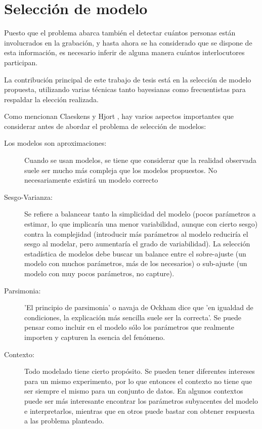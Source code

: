 
\chapter{Selección de modelo} \label{ch:chap4}


Puesto que el problema abarca también el detectar cuántos personas están involucrados en la grabación, y hasta ahora se ha considerado que se dispone de esta información, es necesario inferir de alguna manera cuántos interlocutores participan.

La contribución principal de este trabajo de tesis está en la selección de modelo propuesta, utilizando varias técnicas tanto bayesianas como frecuentistas para respaldar la elección realizada.

Como mencionan Claeskens y Hjort \cite{Claeskens2010}, hay varios aspectos importantes que considerar antes de abordar el problema de selección de modelos: 

\begin{description}
\item[Los modelos son aproximaciones:] Cuando se usan modelos, se tiene que considerar que la realidad observada suele ser mucho más compleja que los modelos propuestos. No necesariamente existirá un modelo correcto 

\item[Sesgo-Varianza:] Se refiere a balancear tanto la simplicidad del modelo (pocos parámetros a estimar, lo que implicaría una menor variabilidad, aunque con cierto sesgo) contra la complejidad (introducir más parámetros al modelo reduciría el sesgo al modelar, pero aumentaría el grado de variabilidad). La selección estadística de modelos debe buscar un balance entre el sobre-ajuste (un modelo con muchos parámetros, más de los necesarios) o sub-ajuste (un modelo con muy pocos parámetros, no capture).

\item[Parsimonia:] 'El principio de parsimonia' o navaja de Ockham dice que 'en igualdad de condiciones, la explicación más sencilla suele ser la correcta'. Se puede pensar como incluir en el modelo sólo los parámetros que realmente importen y capturen la esencia del fenómeno. 

\item[Contexto:] Todo modelado tiene cierto propósito. Se pueden tener diferentes intereses para un mismo experimento, por lo que entonces el contexto no tiene que ser siempre el mismo para un conjunto de datos. En algunos contextos puede ser más interesante encontrar los parámetros subyacentes del modelo e interpretarlos, mientras que en otros puede bastar con obtener respuesta a las problema planteado.

\end{description}

